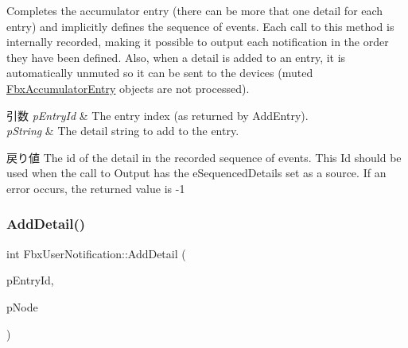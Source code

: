 Completes the accumulator entry (there can be more that one detail for each entry) and implicitly defines the sequence of events. Each call to this method is internally recorded, making it possible to output each notification in the order they have been defined. Also, when a detail is added to an entry, it is automatically unmuted so it can be sent to the devices (muted \hyperlink{class_fbx_accumulator_entry}{Fbx\+Accumulator\+Entry} objects are not processed). 
\begin{DoxyParams}{引数}
{\em p\+Entry\+Id} & The entry index (as returned by Add\+Entry). \\
\hline
{\em p\+String} & The detail string to add to the entry. \\
\hline
\end{DoxyParams}
\begin{DoxyReturn}{戻り値}
The id of the detail in the recorded sequence of events. This Id should be used when the call to Output has the e\+Sequenced\+Details set as a source. If an error occurs, the returned value is -\/1 
\end{DoxyReturn}
\mbox{\label{class_fbx_user_notification_a7e15dc53d4431dcc1411d9ae05498349}} 
\subsubsection{\texorpdfstring{Add\+Detail()}{AddDetail()}\hspace{0.1cm}{\footnotesize\ttfamily [3/3]}}
{\footnotesize\ttfamily int Fbx\+User\+Notification\+::\+Add\+Detail (\begin{DoxyParamCaption}\item[{int}]{p\+Entry\+Id,  }\item[{\hyperlink{class_fbx_node}{Fbx\+Node} $\ast$}]{p\+Node }\end{DoxyParamCaption})}

